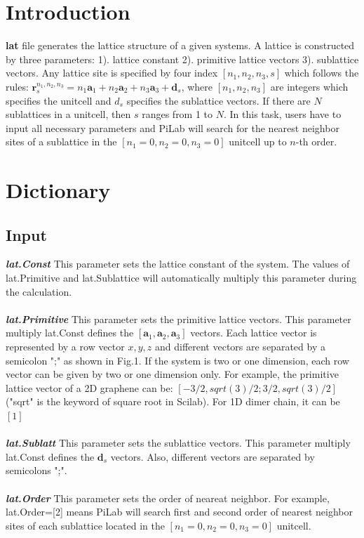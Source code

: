 \documentclass[10pt,a4paper]{article}
\begin{document}
\section{Introduction}
\textbf{lat} file generates the lattice structure of a given systems. A lattice is constructed by three parameters: 1). lattice constant 2). primitive lattice vectors 3). sublattice vectors. Any lattice site is specified by four index $[n_{1},n_{2},n_{3},s]$ which follows the rules: $\textbf{r}_{s}^{n_{1},n_{2},n_{3}}=n_{1}\textbf{a}_{1}+n_{2}\textbf{a}_{2}+n_{3}\textbf{a}_{3}+\textbf{d}_{s}$, where $[n_{1},n_{2},n_{3}]$ are integers which specifies the unitcell and $d_{s}$ specifies the sublattice vectors. If there are $N$ sublattices in a unitcell, then $s$ ranges from 1 to $N$. In this task, users have to input all necessary parameters and PiLab will search for the nearest neighbor sites of a sublattice in the $[n_{1}=0,n_{2}=0,n_{3}=0]$ unitcell up to $n$-th order.

\section{Dictionary}

\subsection{Input}
\textit{\textbf{lat.Const}} This parameter sets the lattice constant of the system. The values of lat.Primitive and lat.Sublattice will automatically multiply this parameter during the calculation. \\ \\
\textit{\textbf{lat.Primitive}} This parameter sets the primitive lattice vectors. This parameter multiply lat.Const defines the $[\textbf{a}_{1},\textbf{a}_{2},\textbf{a}_{3}]$ vectors. Each lattice vector is represented by a row vector $x,y,z$ and different vectors are separated by a semicolon ";" as shown in Fig.1. If the system is two or one dimension, each row vector can be given by two or one dimension only. For example, the primitive lattice vector of a 2D graphene can be: $[-3/2,sqrt(3)/2;3/2,sqrt(3)/2]$ ("sqrt" is the keyword of square root in Scilab). For 1D dimer chain, it can be $[1]$ \\ \\
\textit{\textbf{lat.Sublatt}} This parameter sets the sublattice vectors. This parameter multiply lat.Const defines the $\textbf{d}_{s}$ vectors. Also, different vectors are separated by semicolons ";". \\ \\
\textit{\textbf{lat.Order}} This parameter sets the order of neareat neighbor. For example, lat.Order=[2] means PiLab will search first and second order of nearest neighbor sites of each sublattice located in the $[n_{1}=0,n_{2}=0,n_{3}=0]$ unitcell. 
\end{document}
